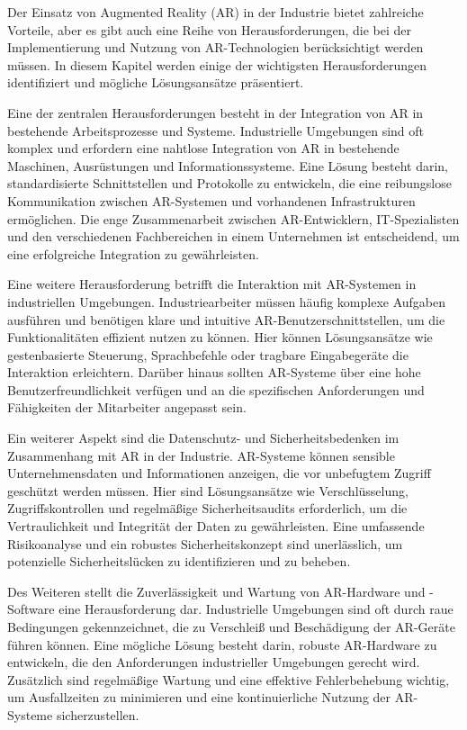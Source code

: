 Der Einsatz von Augmented Reality (AR) in der Industrie bietet zahlreiche
Vorteile, aber es gibt auch eine Reihe von Herausforderungen, die bei der
Implementierung und Nutzung von AR-Technologien berücksichtigt werden müssen.
In diesem Kapitel werden einige der wichtigsten Herausforderungen identifiziert
und mögliche Lösungsansätze präsentiert.

Eine der zentralen Herausforderungen besteht in der Integration von AR in
bestehende Arbeitsprozesse und Systeme. Industrielle Umgebungen sind oft
komplex und erfordern eine nahtlose Integration von AR in bestehende Maschinen,
Ausrüstungen und Informationssysteme. Eine Lösung besteht darin,
standardisierte Schnittstellen und Protokolle zu entwickeln, die eine
reibungslose Kommunikation zwischen AR-Systemen und vorhandenen Infrastrukturen
ermöglichen. Die enge Zusammenarbeit zwischen AR-Entwicklern, IT-Spezialisten
und den verschiedenen Fachbereichen in einem Unternehmen ist entscheidend, um
eine erfolgreiche Integration zu gewährleisten.

Eine weitere Herausforderung betrifft die Interaktion mit AR-Systemen in
industriellen Umgebungen. Industriearbeiter müssen häufig komplexe Aufgaben
ausführen und benötigen klare und intuitive AR-Benutzerschnittstellen, um die
Funktionalitäten effizient nutzen zu können. Hier können Lösungsansätze wie
gestenbasierte Steuerung, Sprachbefehle oder tragbare Eingabegeräte die
Interaktion erleichtern. Darüber hinaus sollten AR-Systeme über eine hohe
Benutzerfreundlichkeit verfügen und an die spezifischen Anforderungen und
Fähigkeiten der Mitarbeiter angepasst sein.

Ein weiterer Aspekt sind die Datenschutz- und Sicherheitsbedenken im
Zusammenhang mit AR in der Industrie. AR-Systeme können sensible
Unternehmensdaten und Informationen anzeigen, die vor unbefugtem Zugriff
geschützt werden müssen. Hier sind Lösungsansätze wie Verschlüsselung,
Zugriffskontrollen und regelmäßige Sicherheitsaudits erforderlich, um die
Vertraulichkeit und Integrität der Daten zu gewährleisten. Eine umfassende
Risikoanalyse und ein robustes Sicherheitskonzept sind unerlässlich, um
potenzielle Sicherheitslücken zu identifizieren und zu beheben.

Des Weiteren stellt die Zuverlässigkeit und Wartung von AR-Hardware und
-Software eine Herausforderung dar. Industrielle Umgebungen sind oft durch raue
Bedingungen gekennzeichnet, die zu Verschleiß und Beschädigung der AR-Geräte
führen können. Eine mögliche Lösung besteht darin, robuste AR-Hardware zu
entwickeln, die den Anforderungen industrieller Umgebungen gerecht wird.
Zusätzlich sind regelmäßige Wartung und eine effektive Fehlerbehebung wichtig,
um Ausfallzeiten zu minimieren und eine kontinuierliche Nutzung der AR-Systeme
sicherzustellen.
